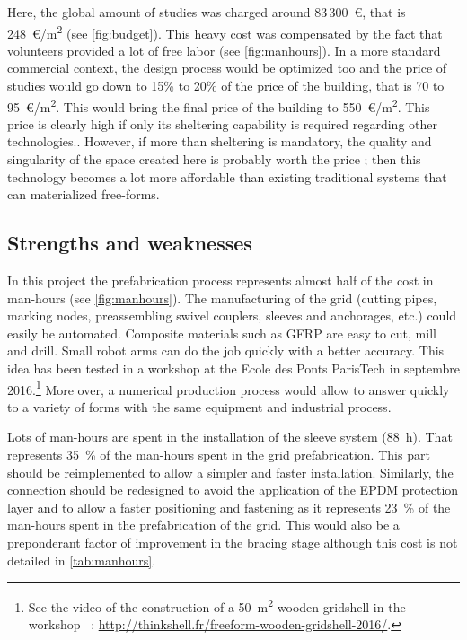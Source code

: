 Here, the global amount of studies was charged around 83\,300~€, that is 248~€/m\textsuperscript{2} (see \cref{fig:budget}). This heavy cost was compensated by the fact that volunteers provided a lot of free labor (see \cref{fig:manhours}). In a more standard commercial context, the design process would be optimized too and the price of studies would go down to 15\% to 20\% of the price of the building, that is 70 to 95~€/m\textsuperscript{2}. This would bring the final price of the building to 550~€/m\textsuperscript{2}. This price is clearly high if only its sheltering capability is required regarding other technologies.. However, if more than sheltering is mandatory, the quality and singularity of the space created here is probably worth the price ; then this technology becomes a lot more affordable than existing traditional systems that can materialized free-forms.

\subsection{Strengths and weaknesses}
In this project the prefabrication process represents almost half of the cost in man-hours (see \cref{fig:manhours}). The manufacturing of the grid (cutting pipes, marking nodes, preassembling swivel couplers, sleeves and anchorages, etc.) could easily be automated. Composite materials such as GFRP are easy to cut, mill and drill. Small robot arms can do the job quickly with a better accuracy. This idea has been tested in a workshop at the Ecole des Ponts ParisTech in septembre 2016.\footnote{See the video of the construction of a 50~m\textsuperscript{2} wooden gridshell in the workshop ~: \url{http://thinkshell.fr/freeform-wooden-gridshell-2016/}.} More over, a numerical production process would allow to answer quickly to a variety of forms with the same equipment and industrial process.

Lots of man-hours are spent in the installation of the sleeve system (88~h). That represents 35~\% of the man-hours spent in the grid prefabrication. This part should be reimplemented to allow a simpler and faster installation. Similarly, the connection should be redesigned to avoid the application of the EPDM protection layer and to allow a faster positioning and fastening as it represents 23~\% of the man-hours spent in the prefabrication of the grid. This would also be a preponderant factor of improvement in the bracing stage although this cost is not detailed in \cref{tab:manhours}.


